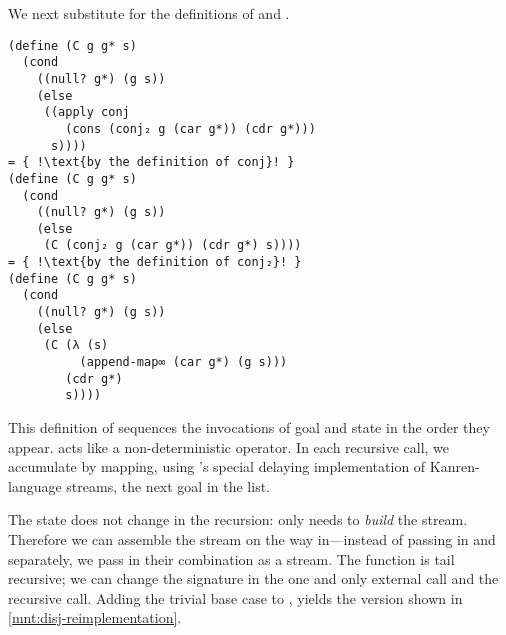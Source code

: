 \documentclass[runningheads,natbib=false]{llncs}
\begin{document}
\noindent We next substitute for the definitions of 
and .

\begin{verbatim}
(define (C g g* s)
  (cond
    ((null? g*) (g s))
    (else
     ((apply conj
        (cons (conj₂ g (car g*)) (cdr g*)))
      s))))
= { !\text{by the definition of conj}! }
(define (C g g* s)
  (cond
    ((null? g*) (g s))
    (else
     (C (conj₂ g (car g*)) (cdr g*) s))))
= { !\text{by the definition of conj₂}! }
(define (C g g* s)
  (cond
    ((null? g*) (g s))
    (else
     (C (λ (s)
          (append-map∞ (car g*) (g s)))
        (cdr g*)
        s))))
\end{verbatim}

This definition of  sequences the invocations of goal
and state in the order they appear.  acts like
a non-deterministic  operator. In each recursive
call, we accumulate by mapping, using 's
special delaying implementation of Kanren-language streams, the next
goal in the list.


The state does not change in the recursion:  only needs
 to \emph{build} the stream. Therefore we can assemble
the stream on the way in---instead of passing in  and
 separately, we pass in their combination as a stream.
The function is tail recursive; we can change the signature in the one
and only external call and the recursive call. Adding the trivial base
case to , yields the version shown in
\cref{mnt:disj-reimplementation}.

\end{document}
